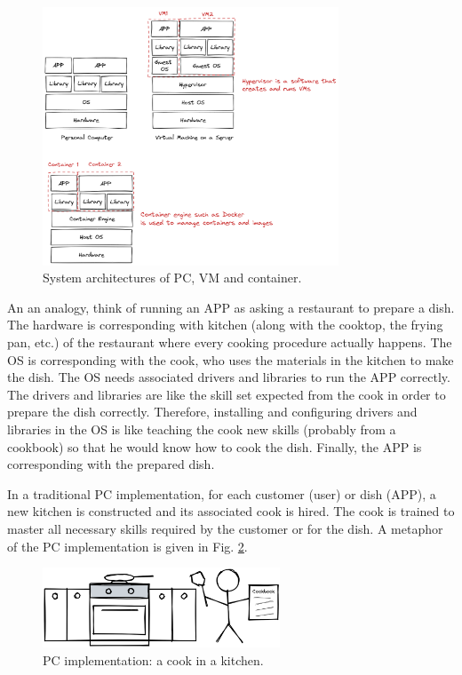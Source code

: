 \begin{figure}
	\centering
	\includegraphics[width=250pt]{chapters/ch_virtualization_and_containerization/figures/pcvmcontainerstructure.png}
	\caption{System architectures of PC, VM and container.} \label{chvirtualizationandcontainerization:fig:pcvmcontainersructure}
\end{figure}

An an analogy, think of running an APP as asking a restaurant to prepare a dish. The hardware is corresponding with kitchen (along with the cooktop, the frying pan, etc.) of the restaurant where every cooking procedure actually happens. The OS is corresponding with the cook, who uses the materials in the kitchen to make the dish. The OS needs associated drivers and libraries to run the APP correctly. The drivers and libraries are like the skill set expected from the cook in order to prepare the dish correctly. Therefore, installing and configuring drivers and libraries in the OS is like teaching the cook new skills (probably from a cookbook) so that he would know how to cook the dish. Finally, the APP is corresponding with the prepared dish.

In a traditional PC implementation, for each customer (user) or dish (APP), a new kitchen is constructed and its associated cook is hired. The cook is trained to master all necessary skills required by the customer or for the dish. A metaphor of the PC implementation is given in Fig. \ref{chvirtualizationandcontainerization:fig:acookinakitchen}.
\begin{figure}
	\centering
	\includegraphics[width=200pt]{chapters/ch_virtualization_and_containerization/figures/acookinakitchen.png}
	\caption{PC implementation: a cook in a kitchen.} \label{chvirtualizationandcontainerization:fig:acookinakitchen}
\end{figure}

